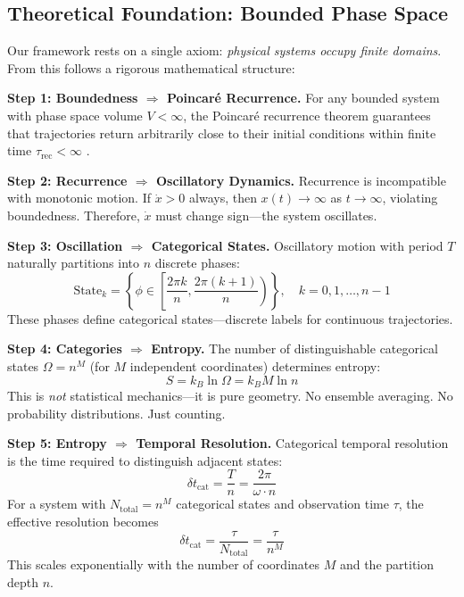 \documentclass[twocolumn,10pt]{article}
\theoremstyle{remark}
\begin{document}
\subsection{Theoretical Foundation: Bounded Phase Space}

Our framework rests on a single axiom: \textit{physical systems occupy finite domains}. From this follows a rigorous mathematical structure:

\textbf{Step 1: Boundedness $\Rightarrow$ Poincaré Recurrence.}
For any bounded system with phase space volume $V < \infty$, the Poincaré recurrence theorem guarantees that trajectories return arbitrarily close to their initial conditions within finite time $\tau_{\text{rec}} < \infty$ \cite{poincare1890}.

\textbf{Step 2: Recurrence $\Rightarrow$ Oscillatory Dynamics.}
Recurrence is incompatible with monotonic motion. If $\dot{x} > 0$ always, then $x(t) \to \infty$ as $t \to \infty$, violating boundedness. Therefore, $\dot{x}$ must change sign---the system oscillates.

\textbf{Step 3: Oscillation $\Rightarrow$ Categorical States.}
Oscillatory motion with period $T$ naturally partitions into $n$ discrete phases:
\begin{equation}
    \text{State}_k = \left\{\phi \in \left[\frac{2\pi k}{n}, \frac{2\pi(k+1)}{n}\right) \right\}, \quad k = 0, 1, \ldots, n-1
\end{equation}
These phases define categorical states---discrete labels for continuous trajectories.

\textbf{Step 4: Categories $\Rightarrow$ Entropy.}
The number of distinguishable categorical states $\Omega = n^M$ (for $M$ independent coordinates) determines entropy:
\begin{equation}
    S = k_B \ln \Omega = k_B M \ln n
\end{equation}
This is \textit{not} statistical mechanics---it is pure geometry. No ensemble averaging. No probability distributions. Just counting.

\textbf{Step 5: Entropy $\Rightarrow$ Temporal Resolution.}
Categorical temporal resolution is the time required to distinguish adjacent states:
\begin{equation}
    \delta t_{\text{cat}} = \frac{T}{n} = \frac{2\pi}{\omega \cdot n}
\end{equation}
For a system with $N_{\text{total}} = n^M$ categorical states and observation time $\tau$, the effective resolution becomes
\begin{equation}
    \delta t_{\text{cat}} = \frac{\tau}{N_{\text{total}}} = \frac{\tau}{n^M}
\end{equation}
This scales exponentially with the number of coordinates $M$ and the partition depth $n$.
\end{document}
